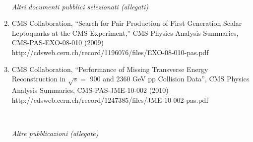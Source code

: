 \documentclass[10pt]{letter}
\begin{document}
\begin{enumerate}
~\\
\begin{center} \textit{Altri documenti pubblici selezionati (allegati)} \\ \end{center}

\item CMS Collaboration, 
  ``Search for Pair Production of First Generation Scalar Leptoquarks at the CMS Experiment,''
  CMS Physics Analysis Summaries, CMS-PAS-EXO-08-010 (2009) \\
  http://cdsweb.cern.ch/record/1196076/files/EXO-08-010-pas.pdf 

\item CMS Collaboration,
  ``Performance of Missing Transverse Energy Reconstruction in $\sqrt{s}=$ 900 and 2360 GeV pp Collision Data'',
  CMS Physics Analysis Summaries, CMS-PAS-JME-10-002 (2010) \\
  http://cdsweb.cern.ch/record/1247385/files/JME-10-002-pas.pdf

~\\
\begin{center} \textit{Altre pubblicazioni (allegate)} \\ \end{center}


\end{enumerate}
\end{document}
